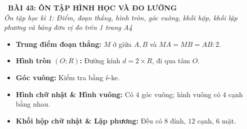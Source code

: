 \documentclass[11pt,a4paper]{article}
\begin{document}
\begin{tcolorbox}[
  enhanced,
  colback=white,
  colframe=primary,
  arc=3mm,
  boxrule=1.2pt,
  left=4mm, right=4mm, top=2.5mm, bottom=2.5mm,
  drop shadow=black!10!white
]
  \centering
  {\Large\bfseries\color{primary}\faBookmark\ BÀI 43: ÔN TẬP HÌNH HỌC VÀ ĐO LƯỜNG}\\[1.5mm]
  {\small\itshape\color{black!75}Ôn tập học kì 1: Điểm, đoạn thẳng, hình tròn, góc vuông, khối hộp, khối lập phương và bảng đơn vị đo trên 1 trang A4}
\end{tcolorbox}

\vspace{-2mm}


\noindent
\begin{minipage}[t]{0.49\textwidth}\vspace{0pt}
\begin{tcolorbox}[
  enhanced,
  colback=blue!4!white,
  colframe=blue!75!black,
  arc=2mm, boxrule=0.8pt,
  left=2mm, right=2mm, top=1.8mm, bottom=1.8mm,
  title={\footnotesize\bfseries\color{white}\faCheckSquare\ 1. Trọng tâm Hình học HK1}
]
{\footnotesize
\begin{itemize}\setlength{\itemsep}{1.5pt}\setlength{\leftskip}{-2.5mm}
  \item \textbf{Trung điểm đoạn thẳng:} $M$ ở giữa $A, B$ và $MA = MB = AB : 2$.
  \item \textbf{Hình tròn $(O; R)$:} Đường kính $d = 2 \times R$, đi qua tâm $O$.
  \item \textbf{Góc vuông:} Kiểm tra bằng ê-ke.
  \item \textbf{Hình chữ nhật \& Hình vuông:} Có $4$ góc vuông; hình vuông có $4$ cạnh bằng nhau.
  \item \textbf{Khối hộp chữ nhật \& Lập phương:} Đều có $8$ đỉnh, $12$ cạnh, $6$ mặt.
\end{itemize}
}
\end{tcolorbox}
\end{minipage}
\hfill
\end{document}
